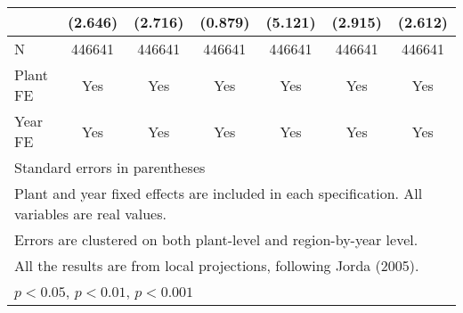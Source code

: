 \begin{table}[htbp]
\begin{tabular}{l*{6}{c}}
                &  (2.646)         &  (2.716)         &  (0.879)         &  (5.121)         &  (2.915)         &  (2.612)         \\
\midrule
N               &   446641         &   446641         &   446641         &   446641         &   446641         &   446641         \\
Plant FE        &      Yes         &      Yes         &      Yes         &      Yes         &      Yes         &      Yes         \\
Year FE         &      Yes         &      Yes         &      Yes         &      Yes         &      Yes         &      Yes         \\
\bottomrule
\multicolumn{7}{l}{\footnotesize Standard errors in parentheses}\\
\multicolumn{7}{l}{\footnotesize Plant and year fixed effects are included in each specification. All variables are real values.}\\
\multicolumn{7}{l}{\footnotesize Errors are clustered on both plant-level and region-by-year level.}\\
\multicolumn{7}{l}{\footnotesize All the results are from local projections, following Jorda (2005).}\\
\multicolumn{7}{l}{\footnotesize \sym{*} \(p<0.05\), \sym{**} \(p<0.01\), \sym{***} \(p<0.001\)}\\
\end{tabular}
\end{table}
